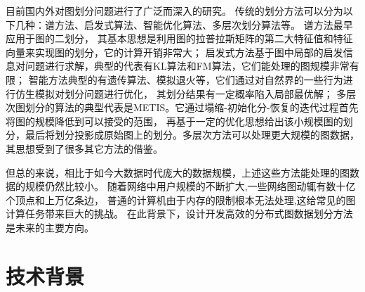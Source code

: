 \documentclass[master]{njuthesis}
\begin{document}
目前国内外对图划分问题进行了广泛而深入的研究。
传统的划分方法可以分为以下几种：谱方法、启发式算法、智能优化算法、多层次划分算法等。
谱方法\cite{DBLP:journals/siamsc/HendricksonL95}最早应用于图的二划分，
其基本思想是利用图的拉普拉斯矩阵的第二大特征值和特征向量来实现图的划分，它的计算开销非常大；
启发式方法基于图中局部的启发信息对问题进行求解，典型的代表有KL\cite{kernighan1970efficient}算法和FM\cite{fiduccia1988linear}算法，它们能处理的图规模非常有限；
智能方法典型的有遗传算法\cite{bui1996genetic}、模拟退火\cite{johnson1989optimization}等，它们通过对自然界的一些行为进行仿生模拟对划分问题进行优化，
其划分结果有一定概率陷入局部最优解；
多层次图划分的算法的典型代表是METIS\cite{Karypis95metis}。它通过塌缩-初始化分-恢复的迭代过程首先将图的规模降低到可以接受的范围，
再基于一定的优化思想给出该小规模图的划分，最后将划分投影成原始图上的划分。多层次方法可以处理更大规模的图数据，
其思想受到了很多其它方法的借鉴。

但总的来说，相比于如今大数据时代庞大的数据规模，上述这些方法能处理的图数据的规模仍然比较小。
随着网络中用户规模的不断扩大,一些网络图动辄有数十亿个顶点和上万亿条边，
普通的计算机由于内存的限制根本无法处理,这给常见的图计算任务带来巨大的挑战。
在此背景下，设计开发高效的分布式图数据划分方法是未来的主要方向。

\section{技术背景}

\end{document}
